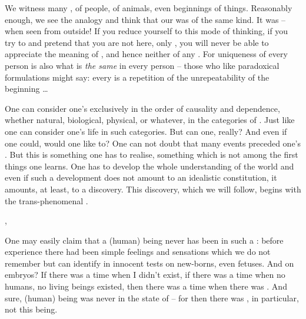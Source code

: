 We witness many , of people, of animals, even beginnings of things.
Reasonably enough, we see the analogy and think that our  was of the
same kind.  It was -- when seen from outside!  If you reduce {yourself} to this
mode of thinking, if you try to  and pretend that you
are not here, only , you will never be able to appreciate the
meaning of , and hence neither of any .  For uniqueness
of every person is also what is {\em the same} in every person -- those who like
paradoxical formulations might say: every  is a repetition of the
unrepeatability of the beginning \ldots{}

One can consider one's  exclusively in the order of causality and
dependence, whether natural, biological, physical, or whatever, in the
 categories of . Just like one can consider one's
life in such categories. But can one, really? And even if one could, would one
like to? One can not doubt that many events preceded one's . But this
is something one has to realise, something which is not among the first things
one learns. One has to develop the whole understanding of the world and even if
such a development does not amount to an idealistic constitution, it amounts, at
least, to a discovery. This discovery, which we will follow, begins with the
trans-phenomenal .


\sep

\pa One may easily claim that a (human) being never has been in such a
: before experience there had been simple
feelings and sensations which we do not remember but can identify in innocent
tests on new-borns, even fetuses.  And on embryos?  If there was a time when I
didn't exist, if there was a time when no humans, no living beings existed, then
there was a time when there was .  And sure, (human) being was never
in the state of  -- for then there was , in
particular, not this being.

